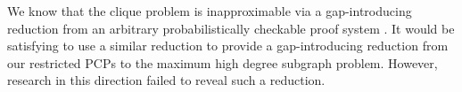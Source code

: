 We know that the clique problem is inapproximable via a gap-introducing reduction from an arbitrary probabilistically checkable proof system \autocite{fglss91}.
It would be satisfying to use a similar reduction to provide a gap-introducing reduction from our restricted PCPs to the maximum high degree subgraph problem.
However, research in this direction failed to reveal such a reduction.





